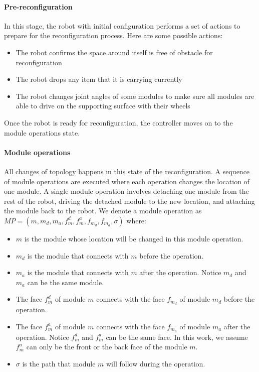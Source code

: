 \documentclass[conference]{IEEEtran}
\begin{document}
\paragraph{Pre-reconfiguration} In this stage, the robot with initial configuration performs a set of actions to prepare for the reconfiguration process. Here are some possible actions:
\begin{itemize}
\item The robot confirms the space around itself is free of obstacle for reconfiguration
\item The robot drops any item that it is carrying currently
\item The robot changes joint angles of some modules to make sure all modules are able to drive on the supporting surface with their wheels
\end{itemize}
Once the robot is ready for reconfiguration, the controller moves on to the module operations state.

\paragraph{Module operations} All changes of topology happens in this state of the reconfiguration.
A sequence of module operations are executed where each operation changes the location of one module.
A single module operation involves detaching one module from the rest of the robot, driving the detached module to the new location, and attaching the module back to the robot.
We denote a module operation as $MP=\left(m, m_d, m_a, f_m^d, f_m^a, f_{m_d}, f_{m_a}, \sigma \right)$ where:
\begin{itemize}
\item $m$ is the module whose location will be changed in this module operation.
\item $m_d$ is the module that connects with $m$ before the operation.
\item $m_a$ is the module that connects with $m$ after the operation. Notice $m_d$ and $m_a$ can be the same module. 
\item The face $f_m^d$ of module $m$ connects with the face $f_{m_d}$ of module $m_d$ before the operation.
\item The face $f_m^a$ of module $m$ connects with the face $f_{m_a}$ of module $m_a$ after the operation. Notice $f_m^d$ and $f_m^a$ can be the same face. In this work, we assume $f_m^a$ can only be the front or the back face of the module $m$.
\item $\sigma$ is the path that module $m$ will follow during the operation.
\end{itemize}
\end{document}
